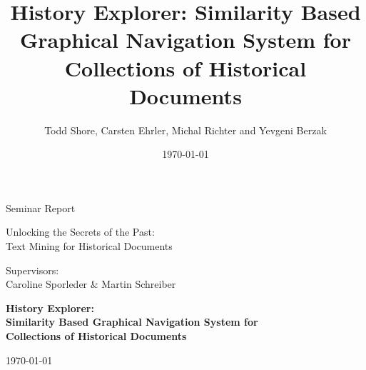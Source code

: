 \documentclass[paper=a4,draft=false]{scrartcl}
\title{History Explorer: Similarity Based Graphical Navigation System for Collections of Historical Documents}
\author{Todd Shore, Carsten Ehrler, Michal Richter and Yevgeni Berzak}
\date{\today}
\begin{document}
\ifpdf
{}
\else
{}
\fi


\begin{titlepage}
\begin{center}
  \vspace{.8in}
  \begin{large}
    Seminar Report\\
  \end{large}
  \vspace{.1in}
  \begin{Large}
    Unlocking the Secrets of the Past:\\
    Text Mining for Historical Documents\\
  \end{Large}
  \vspace{.1in}
  \begin{large}
    Supervisors:\\ Caroline Sporleder \& Martin Schreiber\\
  \end{large}

  \vspace{1.2in}

  \begin{LARGE}
    \textbf{History Explorer:\\Similarity Based Graphical Navigation System for\\Collections of Historical Documents\\}
  \end{LARGE}
  \today
  \vspace{1.5in}

  \end{center}


\end{titlepage}
\end{document}
